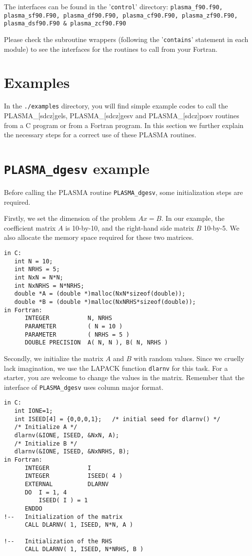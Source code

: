 The interfaces can be found in the '\texttt{control}' directory:
\texttt{plasma\_f90.f90, plasma\_sf90.F90, plasma\_df90.F90,
  plasma\_cf90.F90, plasma\_zf90.F90, plasma\_dsf90.F90 \& plasma\_zcf90.F90}

Please check the subroutine wrappers (following the '\texttt{contains}' statement in each module) to see
the interfaces for the routines to call from your Fortran.


\section{Examples}
In the \texttt{./examples} directory, you will find simple example codes to call
the PLASMA\_[sdcz]gels, PLASMA\_[sdcz]gesv and PLASMA\_[sdcz]posv routines from
a C program or from a Fortran program.  In this section we further explain the necessary
steps for a correct use of these PLASMA routines.

\section{\texttt{PLASMA\_dgesv} example}

Before calling the PLASMA routine \texttt{PLASMA\_dgesv}, some initialization steps 
are required.

Firstly, we set the dimension of the problem $Ax=B$.  In our example, the
coefficient matrix $A$ is 10-by-10, and the right-hand side matrix $B$ 10-by-5.
We also allocate the memory space required for these two matrices.
\begin{verbatim}
in C:
   int N = 10;
   int NRHS = 5;
   int NxN = N*N;
   int NxNRHS = N*NRHS;
   double *A = (double *)malloc(NxN*sizeof(double));
   double *B = (double *)malloc(NxNRHS*sizeof(double));
in Fortran:
      INTEGER           N, NRHS
      PARAMETER         ( N = 10 )
      PARAMETER         ( NRHS = 5 )
      DOUBLE PRECISION  A( N, N ), B( N, NRHS )
\end{verbatim}

Secondly, we initialize the matrix $A$ and $B$ with random values.  Since we
cruelly lack imagination, we use the LAPACK function \texttt{dlarnv} for this
task.  For a starter, you are welcome to change the values in the matrix.
Remember that the interface of \texttt{PLASMA\_dgesv} uses column major format.
\begin{verbatim}
in C:
   int IONE=1;
   int ISEED[4] = {0,0,0,1};   /* initial seed for dlarnv() */
   /* Initialize A */
   dlarnv(&IONE, ISEED, &NxN, A);
   /* Initialize B */
   dlarnv(&IONE, ISEED, &NxNRHS, B);
in Fortran:
      INTEGER           I
      INTEGER           ISEED( 4 )
      EXTERNAL          DLARNV
      DO  I = 1, 4
          ISEED( I ) = 1
      ENDDO
!--   Initialization of the matrix
      CALL DLARNV( 1, ISEED, N*N, A )

!--   Initialization of the RHS
      CALL DLARNV( 1, ISEED, N*NRHS, B )
\end{verbatim}

